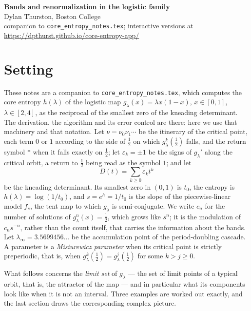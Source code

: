 \documentclass[11pt]{article}
\theoremstyle{plain}
\theoremstyle{definition}
\newcommand{\eps}{\varepsilon}
\begin{document}
\begin{center}
  {\Large\bfseries Bands and renormalization in the logistic family}\\[3pt]
  {\small Dylan Thurston, Boston College}\\[2pt]
  {\small companion to \texttt{core\_entropy\_notes.tex};
   interactive versions at \url{https://dpthurst.github.io/core-entropy-app/}}
\end{center}
\vspace{2pt}

\section{Setting}\label{sec:setting}

These notes are a companion to \texttt{core\_entropy\_notes.tex}, which computes the core
entropy $h(\lambda)$ of the logistic map $g_\lambda(x)=\lambda x(1-x)$, $x\in[0,1]$,
$\lambda\in[2,4]$, as the reciprocal of the smallest zero of the kneading determinant.  The
derivation, the algorithm and its error control are there; here we use that machinery and
that notation.  Let $\nu=\nu_0\nu_1\cdots$ be the itinerary of the critical point, each term
$0$ or $1$ according to the side of $\tfrac12$ on which $g_\lambda^k(\tfrac12)$ falls, and
the return symbol $*$ when it falls exactly on $\tfrac12$; let $\eps_k=\pm1$ be the signs of
$g_\lambda'$ along the critical orbit, a return to $\tfrac12$ being read as the symbol $1$;
and let
\[
  D(t)=\sum_{k\ge0}\eps_k t^k
\]
be the kneading determinant.  Its smallest zero in $(0,1)$ is $t_0$, the entropy is
$h(\lambda)=\log(1/t_0)$, and $s=e^{h}=1/t_0$ is the slope of the piecewise-linear model
$f_s$, the tent map to which $g_\lambda$ is semi-conjugate.  We write $c_n$ for the number of
solutions of $g_\lambda^n(x)=\tfrac12$, which grows like $s^n$; it is the modulation of
$c_ns^{-n}$, rather than the count itself, that carries the information about the bands.  Let
$\lambda_\infty=3.5699456\ldots$ be the accumulation point of the period-doubling cascade.  A
parameter is a \emph{Misiurewicz parameter} when its critical point is strictly preperiodic,
that is, when $g_\lambda^k(\tfrac12)=g_\lambda^j(\tfrac12)$ for some $k>j\ge0$.

What follows concerns the \emph{limit set} of $g_\lambda$ --- the set of limit points of a
typical orbit, that is, the attractor of the map --- and in particular what its components
look like when it is not an interval.  Three examples are worked out exactly, and the last
section draws the corresponding complex picture.
\end{document}
